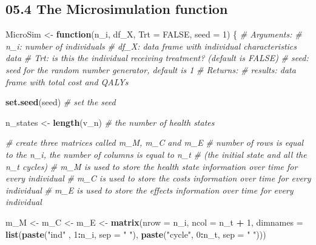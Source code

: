 \documentclass[
]{article}
\newenvironment{Shaded}{\begin{snugshade}}{\end{snugshade}}
\newcommand{\CommentTok}[1]{\textcolor[rgb]{0.56,0.35,0.01}{\textit{#1}}}
\newcommand{\ControlFlowTok}[1]{\textcolor[rgb]{0.13,0.29,0.53}{\textbf{#1}}}
\newcommand{\DataTypeTok}[1]{\textcolor[rgb]{0.13,0.29,0.53}{#1}}
\newcommand{\DecValTok}[1]{\textcolor[rgb]{0.00,0.00,0.81}{#1}}
\newcommand{\KeywordTok}[1]{\textcolor[rgb]{0.13,0.29,0.53}{\textbf{#1}}}
\newcommand{\NormalTok}[1]{#1}
\newcommand{\OperatorTok}[1]{\textcolor[rgb]{0.81,0.36,0.00}{\textbf{#1}}}
\newcommand{\OtherTok}[1]{\textcolor[rgb]{0.56,0.35,0.01}{#1}}
\newcommand{\StringTok}[1]{\textcolor[rgb]{0.31,0.60,0.02}{#1}}
\begin{document}
\hypertarget{the-microsimulation-function}{%
\subsection{05.4 The Microsimulation
function}\label{the-microsimulation-function}}

\begin{Shaded}
\begin{Highlighting}[]
\NormalTok{MicroSim <-}\StringTok{ }\ControlFlowTok{function}\NormalTok{(n_i, df_X, }\DataTypeTok{Trt =} \OtherTok{FALSE}\NormalTok{, }\DataTypeTok{seed =} \DecValTok{1}\NormalTok{) \{}
  \CommentTok{# Arguments:  }
    \CommentTok{# n_i: number of individuals}
    \CommentTok{# df_X: data frame with individual characteristics data }
    \CommentTok{# Trt: is this the individual receiving treatment? (default is FALSE)}
    \CommentTok{# seed: seed for the random number generator, default is 1}
  \CommentTok{# Returns:}
    \CommentTok{# results: data frame with total cost and QALYs}
  
  \KeywordTok{set.seed}\NormalTok{(seed) }\CommentTok{# set the seed}
  
\NormalTok{  n_states <-}\StringTok{ }\KeywordTok{length}\NormalTok{(v_n) }\CommentTok{# the number of health states}
  
  \CommentTok{# create three matrices called m_M, m_C and m_E}
  \CommentTok{# number of rows is equal to the n_i, the number of columns is equal to n_t  }
  \CommentTok{# (the initial state and all the n_t cycles)}
  \CommentTok{# m_M is used to store the health state information over time for every individual}
  \CommentTok{# m_C is used to store the costs information over time for every individual}
  \CommentTok{# m_E is used to store the effects information over time for every individual}
  
\NormalTok{  m_M <-}\StringTok{ }\NormalTok{m_C <-}\StringTok{ }\NormalTok{m_E <-}\StringTok{  }\KeywordTok{matrix}\NormalTok{(}\DataTypeTok{nrow =}\NormalTok{ n_i, }\DataTypeTok{ncol =}\NormalTok{ n_t }\OperatorTok{+}\StringTok{ }\DecValTok{1}\NormalTok{, }
                               \DataTypeTok{dimnames =} \KeywordTok{list}\NormalTok{(}\KeywordTok{paste}\NormalTok{(}\StringTok{"ind"}\NormalTok{  , }\DecValTok{1}\OperatorTok{:}\NormalTok{n_i, }\DataTypeTok{sep =} \StringTok{" "}\NormalTok{), }
                                               \KeywordTok{paste}\NormalTok{(}\StringTok{"cycle"}\NormalTok{, }\DecValTok{0}\OperatorTok{:}\NormalTok{n_t, }\DataTypeTok{sep =} \StringTok{" "}\NormalTok{)))  }


\end{Highlighting}
\end{Shaded}
\end{document}
